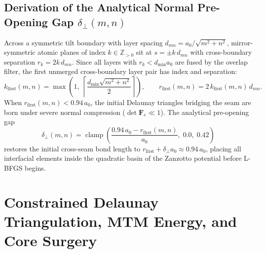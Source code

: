 \documentclass[11pt,a4paper]{article}
\newcommand{\Z}{\mathbb{Z}}
\begin{document}
\subsection{Derivation of the Analytical Normal Pre-Opening Gap $\delta_\perp(m,n)$}
Across a symmetric tilt boundary with layer spacing $d_{mn} = a_0/\sqrt{m^2+n^2}$, mirror-symmetric atomic planes of index $k \in \Z_{>0}$ sit at $s = \pm k\,d_{mn}$ with cross-boundary separation $r_k = 2k\,d_{mn}$. Since all layers with $r_k < d_{\min} a_0$ are fused by the overlap filter, the first unmerged cross-boundary layer pair has index and separation:
\begin{equation}
  k_{\text{first}}(m,n) = \max\!\left(1,\; \left\lceil \frac{d_{\min}\sqrt{m^2+n^2}}{2} \right\rceil\right), \qquad
  r_{\text{first}}(m,n) = 2\,k_{\text{first}}(m,n)\,d_{mn}.
\end{equation}
When $r_{\text{first}}(m,n) < 0.94\,a_0$, the initial Delaunay triangles bridging the seam are born under severe normal compression ($\det\mathbf{F}_e \ll 1$). The analytical pre-opening gap
\begin{equation}
  \delta_\perp(m,n) = \operatorname{clamp}\!\left(\frac{0.94\,a_0 - r_{\text{first}}(m,n)}{a_0},\; 0.0,\; 0.42\right)
\end{equation}
restores the initial cross-seam bond length to $r_{\text{first}} + \delta_\perp a_0 \approx 0.94\,a_0$, placing all interfacial elements inside the quadratic basin of the Zanzotto potential before L-BFGS begins.

\section{Constrained Delaunay Triangulation, MTM Energy, and Core Surgery}
\end{document}
